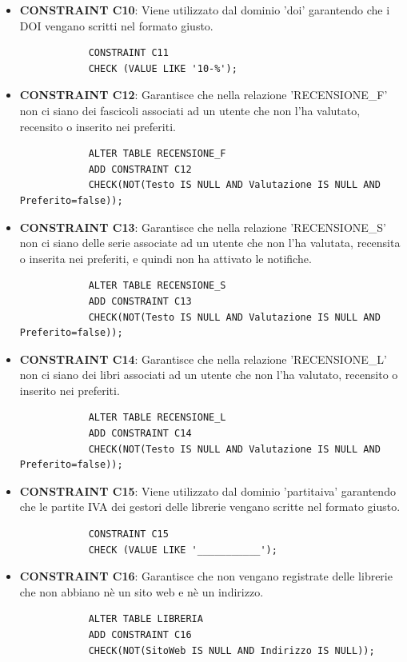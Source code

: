\documentclass{article}
\begin{document}
\begin{itemize}
        \item \textbf{CONSTRAINT C10}: Viene utilizzato dal dominio 'doi' garantendo che i DOI vengano scritti nel formato giusto.
        \begin{verbatim}
            CONSTRAINT C11
            CHECK (VALUE LIKE '10-%');
        \end{verbatim}

        \item \textbf{CONSTRAINT C12}: Garantisce che nella relazione 'RECENSIONE\_F' non ci siano dei fascicoli associati ad un utente che non l'ha valutato, recensito o inserito nei preferiti.
        \begin{verbatim}
            ALTER TABLE RECENSIONE_F
            ADD CONSTRAINT C12
            CHECK(NOT(Testo IS NULL AND Valutazione IS NULL AND Preferito=false));
        \end{verbatim}

        \item \textbf{CONSTRAINT C13}: Garantisce che nella relazione 'RECENSIONE\_S' non ci siano delle serie associate ad un utente che non l'ha valutata, recensita o inserita nei preferiti, e quindi non ha attivato le notifiche.
        \begin{verbatim}
            ALTER TABLE RECENSIONE_S
            ADD CONSTRAINT C13
            CHECK(NOT(Testo IS NULL AND Valutazione IS NULL AND Preferito=false));
        \end{verbatim}

        \item \textbf{CONSTRAINT C14}: Garantisce che nella relazione 'RECENSIONE\_L' non ci siano dei libri associati ad un utente che non l'ha valutato, recensito o inserito nei preferiti.
        \begin{verbatim}
            ALTER TABLE RECENSIONE_L
            ADD CONSTRAINT C14
            CHECK(NOT(Testo IS NULL AND Valutazione IS NULL AND Preferito=false));
        \end{verbatim}

        \item \textbf{CONSTRAINT C15}: Viene utilizzato dal dominio 'partitaiva' garantendo che le partite IVA dei gestori delle librerie vengano scritte nel formato giusto.
        \begin{verbatim}
            CONSTRAINT C15
            CHECK (VALUE LIKE '___________');
        \end{verbatim}

        \item \textbf{CONSTRAINT C16}: Garantisce che non vengano registrate delle librerie che non abbiano nè un sito web e nè un indirizzo.
        \begin{verbatim}
            ALTER TABLE LIBRERIA
            ADD CONSTRAINT C16
            CHECK(NOT(SitoWeb IS NULL AND Indirizzo IS NULL));
        \end{verbatim}


\end{itemize}
\end{document}
